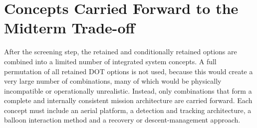 \vspace{-20pt}
\section{Concepts Carried Forward to the Midterm Trade-off}
\label{sec:concepts_carried_forward}


After the screening step, the retained and conditionally retained options are combined into a limited number of integrated system concepts. A full permutation of all retained DOT options is not used, because this would create a very large number of combinations, many of which would be physically incompatible or operationally unrealistic. Instead, only combinations that form a complete and internally consistent mission architecture are carried forward. Each concept must include an aerial platform, a detection and tracking architecture, a balloon interaction method and a recovery or descent-management approach.


